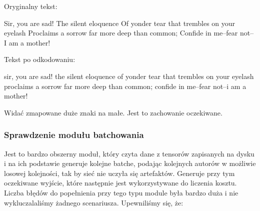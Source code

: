 	Oryginalny tekst:
	\begin{bash}
 Sir, you are sad! The silent eloquence
 Of yonder tear that trembles on your eyelash
 Proclaims a sorrow far more deep than common;
 Confide in me--fear not--I am a mother!
	\end{bash}
	
	Tekst po odkodowaniu: 
	\begin{bash}
sir, you are sad! the silent eloquence
of yonder tear that trembles on your eyelash
proclaims a sorrow far more deep than common;
confide in me--fear not--i am a mother!
	\end{bash}
	Widać zmapowane duże znaki na małe. Jest to zachowanie oczekiwane. 
	
\subsubsection{Sprawdzenie modułu batchowania}
	  Jest to bardzo obszerny moduł, który czyta dane z tensorów zapisanych na dysku
	  i na ich podstawie generuje kolejne batche, podając kolejnych autorów w możliwie losowej kolejności, tak by sieć
	  nie uczyła się artefaktów. Generuje przy tym oczekiwane wyjście, które następnie jest wykorzystywane do 
	  liczenia kosztu. Liczba błędów do popełnienia przy tego typu module była bardzo duża i nie wykluczalaliśmy
	  żadnego scenariusza. Upewniliśmy się, że:
